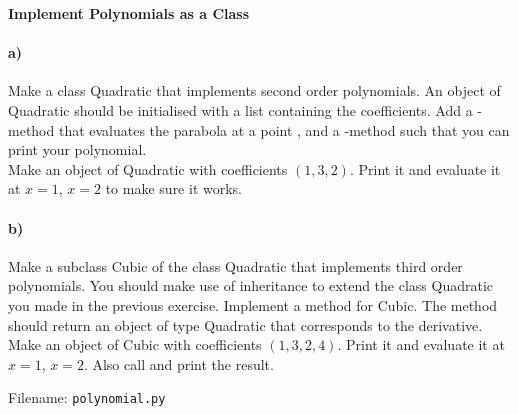 \newpage
\begin{Problem}{\textbf{Implement Polynomials as a Class}} \label{prob92}

\paragraph{a)}
Make a class Quadratic that implements second order polynomials. An object of Quadratic should be initialised with a list containing the coefficients. Add a -method that evaluates the parabola at a point , and a -method such that you can print your polynomial.
\\
Make an object of Quadratic with coefficients $(1, 3, 2)$. Print it and evaluate it at $x=1$, $x=2$ to make sure it works.   

\paragraph{b)}
Make a subclass Cubic of the class Quadratic that implements third order polynomials. You should make use of inheritance to extend the class Quadratic you made in the previous exercise. Implement a method  for Cubic. The method should return an object of type Quadratic that corresponds to the derivative.
\\
Make an object of Cubic with coefficients $(1, 3, 2, 4)$. Print it and evaluate it at $x=1$, $x=2$. Also call  and print the result.

Filename: \texttt{polynomial.py}
\end{Problem} 

